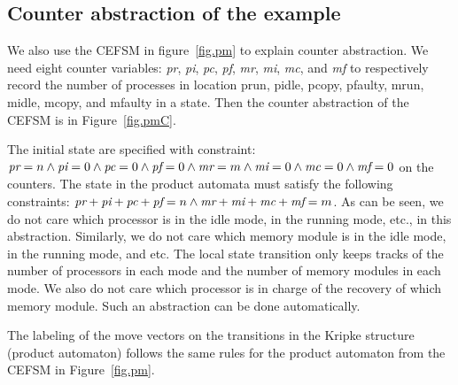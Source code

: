 \documentclass[times,10pt,twocolumn]{article}
\begin{document}
\subsection*{Counter abstraction of the example} 
We also use the CEFSM in figure~\ref{fig.pm} to explain counter abstraction. 
We need eight counter variables: 
{\em pr}, 
{\em pi}, 
{\em pc}, 
{\em pf}, 
{\em mr}, 
{\em mi}, 
{\em mc}, and 
{\em mf} to respectively record the 
number of processes in location prun, pidle, pcopy, pfaulty, mrun, midle, mcopy, and mfaulty
in a state.  
Then the counter abstraction of the CEFSM is in Figure~\ref{fig.pmC}.  
\begin{figure*}[t] 
\begin{center} 
\caption{Counter abstraction of the CEFSM templates of $n$ processors and $m$ memory copies}
\label{fig.pmC}
\end{center} 
\end{figure*}
The initial state are specified with constraint: 
$\mbox{\em pr}=n
\wedge \mbox{\em pi}=0
\wedge \mbox{\em pc}=0
\wedge \mbox{\em pf}=0
\wedge \mbox{\em mr}=m
\wedge \mbox{\em mi}=0
\wedge \mbox{\em mc}=0
\wedge \mbox{\em mf}=0$
on the counters.  
The state in the product automata must satisfy the following constraints: 
$\mbox{\em pr}+\mbox{\em pi}+\mbox{\em pc}+\mbox{\em pf}=n
\wedge \mbox{\em mr}+\mbox{\em mi}+\mbox{\em mc}+\mbox{\em mf}=m$.  
As can be seen, we do not care which processor is in the idle mode, 
in the running mode, etc., in this abstraction. 
Similarly, we do not care which memory module is in the idle mode, in the running mode, and etc. 
The local state transition only keeps tracks of the number of processors in each mode and 
the number of memory modules in each mode. 
We also do not care which processor is in charge of the recovery of which memory module.  
Such an abstraction can be done automatically.  

The labeling of the move vectors on the transitions in the Kripke structure (product automaton)
follows the same rules for the product automaton from the CEFSM in Figure~\ref{fig.pm}.  
\end{document}
